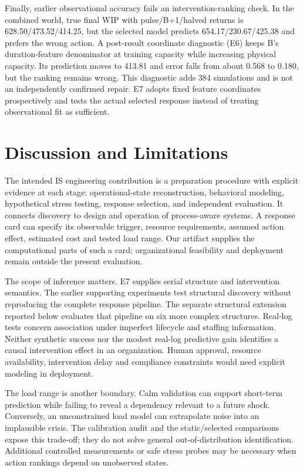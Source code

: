 \documentclass[runningheads]{llncs}
\begin{document}
Finally, earlier observational accuracy fails an intervention-ranking check. In the combined world, true final WIP with pulse/B+1/halved returns is 628.50/473.52/414.25, but the selected model predicts 654.17/230.67/425.38 and prefers the wrong action. A post-result coordinate diagnostic (E6) keeps B's duration-feature denominator at training capacity while increasing physical capacity. Its prediction moves to 413.81 and error falls from about 0.568 to 0.180, but the ranking remains wrong. This diagnostic adds 384 simulations and is not an independently confirmed repair. E7 adopts fixed feature coordinates prospectively and tests the actual selected response instead of treating observational fit as sufficient.

\section{Discussion and Limitations}
The intended IS engineering contribution is a preparation procedure with explicit evidence at each stage: operational-state reconstruction, behavioral modeling, hypothetical stress testing, response selection, and independent evaluation. It connects discovery to design and operation of process-aware systems. A response card can specify its observable trigger, resource requirements, assumed action effect, estimated cost and tested load range. Our artifact supplies the computational parts of such a card; organizational feasibility and deployment remain outside the present evaluation.

The scope of inference matters. E7 supplies serial structure and intervention semantics. The earlier supporting experiments test structural discovery without reproducing the complete response pipeline. The separate structural extension reported below evaluates that pipeline on six more complex structures. Real-log tests concern association under imperfect lifecycle and staffing information. Neither synthetic success nor the modest real-log predictive gain identifies a causal intervention effect in an organization. Human approval, resource availability, intervention delay and compliance constraints would need explicit modeling in deployment.

The load range is another boundary. Calm validation can support short-term prediction while failing to reveal a dependency relevant to a future shock. Conversely, an unconstrained load model can extrapolate noise into an implausible crisis. The calibration audit and the static/selected comparisons expose this trade-off; they do not solve general out-of-distribution identification. Additional controlled measurements or safe stress probes may be necessary when action rankings depend on unobserved states.
\end{document}
